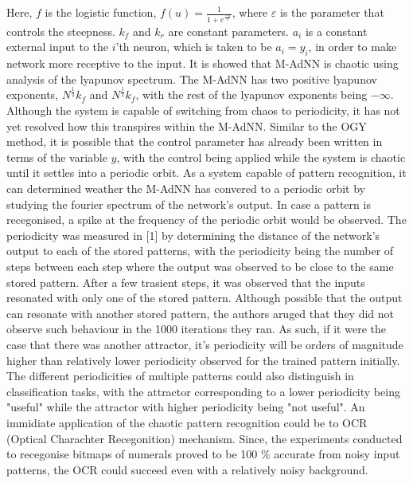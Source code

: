 \documentclass[12pt, letterpaper]{article}
\begin{document}
Here, $f$ is the logistic function, $f(u) = \frac{1}{1 + e^\frac{-u}{\varepsilon}}$, where $\varepsilon$ is the parameter that controls the steepness. $k_f$ and $k_r$ are constant parameters. $a_i$ is a constant external input to the $i$'th neuron, which is taken to be $a_i = y_i$, in order to make network more receptive to the input.
It is showed that M-AdNN is chaotic using analysis of the lyapunov spectrum. The M-AdNN has two positive lyapunov exponents, $N^{\frac{1}{2}}k_f$ and $N^{\frac{1}{2}}k_f$, with the rest of the lyapunov exponents being $-\infty$. Although the system is capable of switching from chaos to periodicity, it has not yet resolved how this transpires within the M-AdNN. Similar to the OGY method, it is possible that the control parameter has already been written in terms of the variable $y$, with the control being applied while the system is chaotic until it settles into a periodic orbit. As a system capable of pattern recognition, it can determined weather the M-AdNN has convered to a periodic orbit by studying the fourier spectrum of the network's output. In case a pattern is recegonised, a spike at the frequency of the periodic orbit would be observed. The periodicity was measured in [1] by determining the distance of the network's output to each of the stored patterns, with the periodicity being the number of steps between each step where the output was observed to be close to the same stored pattern. After a few trasient steps, it was observed that the inputs resonated with only one of the stored pattern. Although possible that the output can resonate with another stored pattern, the authors aruged that they did not observe such behaviour in the 1000 iterations they ran. As such, if it were the case that there was another attractor, it's periodicity will be orders of magnitude higher than relatively lower periodicity observed for the trained pattern initially. The different periodicities of multiple patterns could also distinguish in classification tasks, with the attractor corresponding to a lower periodicity being "useful" while the attractor with higher periodicity being "not useful". An immidiate application of the chaotic pattern recognition could be to OCR (Optical Charachter Recegonition) mechanism. Since, the experiments conducted to recegonise bitmaps of numerals proved to be 100 \% accurate from noisy input patterns, the OCR could succeed even with a relatively noisy background.
\end{document}
